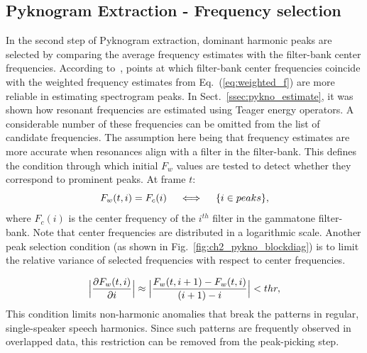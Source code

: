 {\subsection{Pyknogram Extraction - Frequency selection}
\label{sssec:pykno_select}
In the second step of Pyknogram extraction, dominant harmonic peaks are selected by comparing the average frequency estimates with the filter-bank center frequencies. 
According to~\cite{potamianos_maragos_jasa96}, points at which filter-bank center frequencies coincide with the weighted frequency estimates from Eq.~(\ref{eq:weighted_f}) are more reliable in estimating spectrogram peaks. 
In Sect.~\ref{ssec:pykno_estimate}, it was shown how resonant frequencies are estimated using Teager energy operators. 
A considerable number of these frequencies can be omitted from the list of candidate frequencies. 
The assumption here being that frequency estimates are more accurate when resonances align with a filter in the filter-bank. 
This defines the condition through which initial $F_w$ values are tested to detect whether they correspond to prominent peaks. At frame $t$: 
\vspace{0mm}
\begin{equation}
\label{eq:RF1}
F_w(t,i) = F_c(i)  \quad \iff \quad \{i \in peaks\},
\vspace{1mm}
\end{equation}
where $F_c(i)$ is the center frequency of the $i^{th}$ filter in the gammatone filter-bank. 
Note that center frequencies are distributed in a logarithmic scale. 
Another peak selection condition (as shown in Fig.~\ref{fig:ch2_pykno_blockdiag}) is to limit the relative variance of selected frequencies with respect to center frequencies. 

\begin{equation}
\label{eq:RF2}
\Big|\frac{\partial F_w(t,i)}{\partial i} \Big| \approx \Big|\frac{F_w(t,i+1) - F_w(t,i)}{(i+1) - i}\Big| < thr, 
\vspace{1mm}
\end{equation}
This condition limits non-harmonic anomalies that break the patterns in regular, single-speaker speech harmonics. 
Since such patterns are frequently observed in overlapped data, this restriction can be removed from the peak-picking step.  

}
